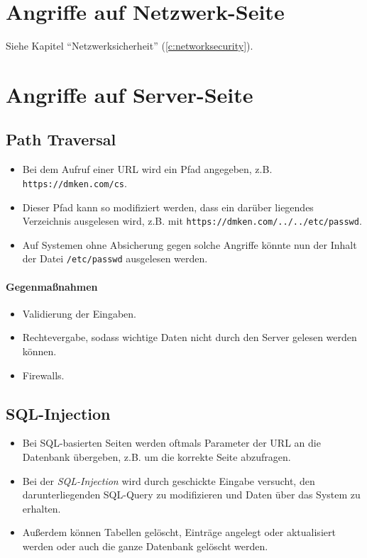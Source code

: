 \documentclass[a4paper, 11pt, accentcolor = tud3b]{tudreport}
\begin{document}
		\section{Angriffe auf Netzwerk-Seite}
			Siehe Kapitel \enquote{Netzwerksicherheit} (\ref{c:networksecurity}).
		
		\section{Angriffe auf Server-Seite}
			\subsection{Path Traversal}
				\begin{itemize}
					\item Bei dem Aufruf einer URL wird ein Pfad angegeben, z.B. \texttt{https://dmken.com/cs}.
					\item Dieser Pfad kann so modifiziert werden, dass ein darüber liegendes Verzeichnis ausgelesen wird, z.B. mit \texttt{https://dmken.com/../../etc/passwd}.
					\item Auf Systemen ohne Absicherung gegen solche Angriffe könnte nun der Inhalt der Datei \texttt{/etc/passwd} ausgelesen werden.
				\end{itemize}
				
				\paragraph{Gegenmaßnahmen}
					\begin{itemize}
						\item Validierung der Eingaben.
						\item Rechtevergabe, sodass wichtige Daten nicht durch den Server gelesen werden können.
						\item Firewalls.
					\end{itemize}
			
			\subsection{SQL-Injection}
				\begin{itemize}
					\item Bei SQL-basierten Seiten werden oftmals Parameter der URL an die Datenbank übergeben, z.B. um die korrekte Seite abzufragen.
					\item Bei der \textit{SQL-Injection} wird durch geschickte Eingabe versucht, den darunterliegenden SQL-Query zu modifizieren und Daten über das System zu erhalten.
					\item Außerdem können Tabellen gelöscht, Einträge angelegt oder aktualisiert werden oder auch die ganze Datenbank gelöscht werden.
				\end{itemize}
			
\end{document}
